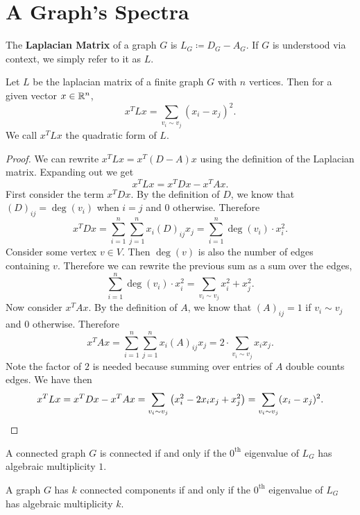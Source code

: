 \documentclass[12pt]{article}
\begin{document}
\section{A Graph's Spectra}

\begin{definition}
    The \textbf{Laplacian Matrix} of a graph $G$ is $L_G \coloneq D_G - A_G$. If $G$ is understood via context, we simply refer to it as $L$.
\end{definition}

\begin{theorem}
    Let $L$ be the laplacian matrix of a finite graph $G$ with $n$ vertices. Then for a given vector $x \in \mathbb{R}^n$,
    \[
        x^T L x = \sum_{v_i \sim v_j} (x_i - x_j)^2.
    \]
    We call $x^T L x$ the quadratic form of $L$.
\end{theorem}

\begin{proof}
    We can rewrite $x^T L x = x^T (D - A) x$ using the definition of the Laplacian matrix. Expanding out we get
    \[
        x^T L x = x^T D x - x^T A x
    .\]
    First consider the term $x^T D x$. By the definition of $D$, we know that $(D)_{ij} = \deg(v_i)$ when $i = j$ and $0$ otherwise. Therefore
    \[
        x^T D x = \sum_{i=1}^n \sum_{j=1}^n x_i (D)_{ij} x_j = \sum_{i=1}^n \deg(v_i) \cdot x_i^2
    .\]
    Consider some vertex $v \in V$. Then $\deg(v)$ is also the number of edges containing $v$. Therefore we can rewrite the previous sum as a sum over the edges,
    \[
        \sum_{i=1}^n \deg(v_i) \cdot x_i^2 = \sum_{v_i \sim v_j} x_i^2 + x_j^2
    .\]
    Now consider $x^T A x$. By the definition of $A$, we know that $(A)_{ij} = 1$ if $v_i \sim v_j$ and $0$ otherwise. Therefore
    \[
        x^T A x = \sum_{i=1}^n \sum_{j=1}^n x_i (A)_{ij} x_j = 2 \cdot\sum_{v_i \sim v_j} x_i x_j
    .\]
    Note the factor of $2$ is needed because summing over entries of $A$ double counts edges. We have then
    \[
        x^T L x = x^T D x - x^T A x = \sum_{v_i \sim v_j} \qty(x_i^2 - 2 x_i x_j + x_j^2) = \sum_{v_i \sim v_j} (x_i - x_j)^2
        .\qedhere
    \]
\end{proof}

\begin{lemma}
    A connected graph $G$ is connected if and only if the $0^\text{th}$ eigenvalue of $L_G$ has algebraic multiplicity $1$.
\end{lemma}

\begin{theorem}
    A graph $G$ has $k$ connected components if and only if the $0^\text{th}$ eigenvalue of $L_G$ has algebraic multiplicity $k$.
\end{theorem}
\end{document}
